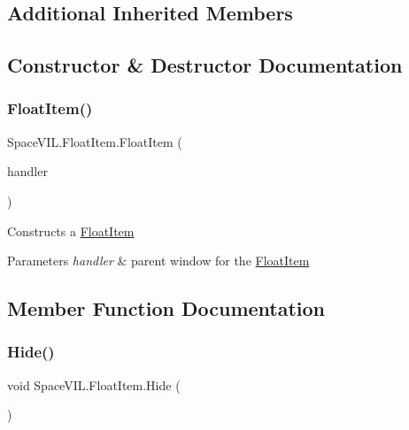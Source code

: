 \subsection*{Additional Inherited Members}


\subsection{Constructor \& Destructor Documentation}
\mbox{\label{class_space_v_i_l_1_1_float_item_af80858fea5cd334aeea694ad34f9e9e6}} 
\subsubsection{\texorpdfstring{Float\+Item()}{FloatItem()}}
{\footnotesize\ttfamily Space\+V\+I\+L.\+Float\+Item.\+Float\+Item (\begin{DoxyParamCaption}\item[{\mbox{\hyperlink{class_space_v_i_l_1_1_window_layout}{Window\+Layout}}}]{handler }\end{DoxyParamCaption})}



Constructs a \mbox{\hyperlink{class_space_v_i_l_1_1_float_item}{Float\+Item}} 


\begin{DoxyParams}{Parameters}
{\em handler} & parent window for the \mbox{\hyperlink{class_space_v_i_l_1_1_float_item}{Float\+Item}} \\
\hline
\end{DoxyParams}


\subsection{Member Function Documentation}
\mbox{\label{class_space_v_i_l_1_1_float_item_a7087e7124eae00d372a68b9966a2548d}} 
\subsubsection{\texorpdfstring{Hide()}{Hide()}}
{\footnotesize\ttfamily void Space\+V\+I\+L.\+Float\+Item.\+Hide (\begin{DoxyParamCaption}{ }\end{DoxyParamCaption})}



